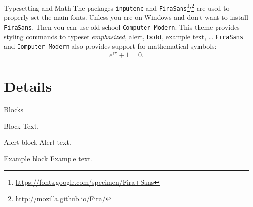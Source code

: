 \documentclass{beamer}
\begin{document}
    \begin{frame}{Typesetting and Math}
        The packages \texttt{inputenc} and \texttt{FiraSans}\footnote{\url{https://fonts.google.com/specimen/Fira+Sans}}\textsuperscript{,}\footnote{\url{http://mozilla.github.io/Fira/}} are used to properly set the main fonts. Unless you are on Windows and don't want to install \texttt{FiraSans}. Then you can use old school \texttt{Computer Modern}.
        \vfill
        This theme provides styling commands to typeset \emph{emphasized}, \alert{alert}, \textbf{bold}, \textcolor{BSElightgreen}{example text}, \dots
        \vfill
        \texttt{FiraSans} and \texttt{Computer Modern} also provides support for mathematical symbols:
        \begin{equation*}
            e^{i\pi} + 1 = 0.
        \end{equation*}
    \end{frame}

    \section{Details}
    \begin{frame}{Blocks}
        \begin{block}{Block}
            Text.
        \end{block}
        \pause
        \begin{alertblock}{Alert block}
            Alert \alert{text}.
        \end{alertblock}
        \pause
        \begin{exampleblock}{Example block}
            Example \textcolor{BSElightgreen}{text}.
        \end{exampleblock}
    \end{frame}
    
\end{document}
